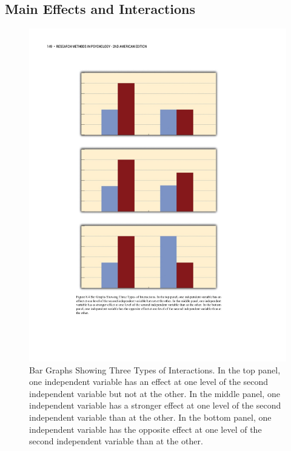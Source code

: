 \subsection{Main Effects and Interactions}

\begin{figure}[0in]

\includegraphics[width=\linewidth]{figures/C8interactionbars.pdf}

\caption{Bar Graphs Showing Three Types of Interactions. In the top panel, one independent variable has an effect at one level of the second independent variable but not at the other. In the middle panel, one independent variable has a stronger effect at one level of the second independent variable than at the other. In the bottom panel, one independent variable has the opposite effect at one level of the second independent variable than at the other.}

\label{fig:interactionbars}

\end{figure}

